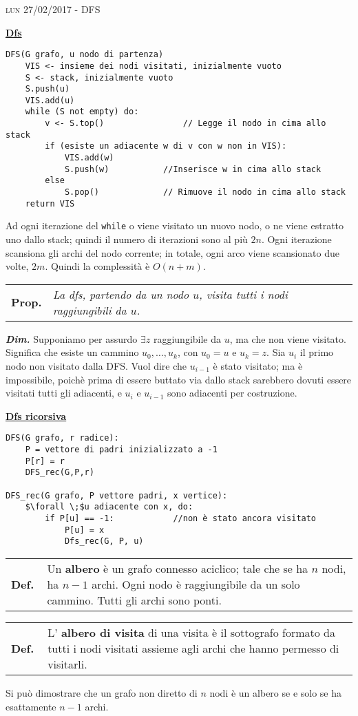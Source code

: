 \documentclass[a4paper,10pt]{article} %
\newcommand{\dimo}[1]{%
    \smallbreak \par \hfill\begin{minipage}{0.92\linewidth}{ \scriptsize {\textbf{\em{Dim.}}} {#1} }\end{minipage} \smallskip \par}
\newcommand{\malgorithm}[1]{%
    {\bigbreak \par \hspace*{4pt} \underline{\textbf {#1}}}}
\newcommand{\msection}[1]{%
    {\newpage\bigbreak \bigbreak \par \hfil \huge \textsc {#1}}\par}
\renewcommand{\b}[1]{%
    {\textbf{#1}}}
\newcommand{\mdef}[1]{%
    {\smallbreak\par\begin{tabular}{ll} \textbf{Def.$\;\;$} & \begin{minipage}[t]{0.80\columnwidth}\normalsize  {#1}\end{minipage}\tabularnewline \end{tabular}}\smallskip\par}
\newcommand{\mprop}[1]{%
    {\smallbreak\par\begin{tabular}{ll} \textbf{Prop.} & \begin{minipage}[t]{0.8\columnwidth}\emph  {#1}\end{minipage}\tabularnewline \end{tabular}}\smallskip\par}
\begin{document}
\msection{lun 27/02/2017 - DFS}




\malgorithm{Dfs}
\begin{lstlisting}
DFS(G grafo, u nodo di partenza)
	VIS <- insieme dei nodi visitati, inizialmente vuoto
	S <- stack, inizialmente vuoto
	S.push(u)
	VIS.add(u)
    while (S not empty) do:
		v <- S.top() 				// Legge il nodo in cima allo stack 
        if (esiste un adiacente w di v con w non in VIS):
			VIS.add(w)
			S.push(w) 			//Inserisce w in cima allo stack 
        else
			S.pop() 			// Rimuove il nodo in cima allo stack 
	return VIS
\end{lstlisting}

Ad ogni iterazione del \texttt{while} o viene visitato un nuovo nodo, o ne viene estratto uno dallo stack; quindi il numero di iterazioni sono al più $2n$. Ogni iterazione scansiona gli archi del nodo corrente; in totale, ogni arco viene scansionato due volte, $2m$. Quindi la complessità è $O(n + m)$.

\mprop{La dfs, partendo da un nodo $u$, visita tutti i nodi raggiungibili da $u$. }
\dimo{
    Supponiamo per assurdo $\exists z$ raggiungibile da $u$, ma che non viene visitato. Significa che esiste un cammino $u_0, \ldots, u_k$, con $u_0 = u$ e $u_k = z$. Sia $u_i$ il primo nodo non visitato dalla DFS. Vuol dire che $u_{i-1}$ è stato visitato; ma è impossibile, poichè prima di essere buttato via dallo stack sarebbero dovuti essere visitati tutti gli adiacenti, e $u_i $ e $u_{i-1}$ sono adiacenti per costruzione.
}

\malgorithm{Dfs ricorsiva}
\begin{lstlisting}
DFS(G grafo, r radice):
    P = vettore di padri inizializzato a -1
    P[r] = r
    DFS_rec(G,P,r)

DFS_rec(G grafo, P vettore padri, x vertice):
    $\forall \;$u adiacente con x, do:
        if P[u] == -1:            //non è stato ancora visitato
            P[u] = x
            Dfs_rec(G, P, u)
\end{lstlisting}

\mdef{Un \b{albero} è un grafo connesso aciclico; tale che se ha $n$ nodi, ha $n - 1$ archi. Ogni nodo è raggiungibile da un solo cammino. Tutti gli archi sono ponti.}
\mdef{L'\b{albero di visita} di una visita è il sottografo formato da tutti i nodi visitati assieme agli archi che hanno permesso di visitarli.}
Si può dimostrare che un grafo non diretto di $n$ nodi è un albero se e solo se ha esattamente $n - 1$ archi.
\end{document}

